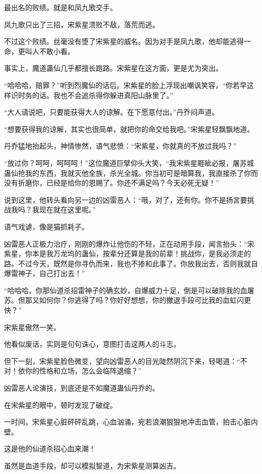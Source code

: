 \begin{this_body}
最出名的败绩。就是和凤九歌交手。

凤九歌只出了三招，宋紫星溃败不敌，落荒而逃。

不过这个败绩。丝毫没有堕了宋紫星的威名。因为对手是凤九歌，他却能逃得一命，更叫人不敢小看。

事实上，魔道蛊仙几乎都擅长跑路。宋紫星在这方面，更是尤为突出。

“哈哈哈，赔罪？”听到烈魔仙的话后。宋紫星的脸上浮现出嘲讽笑容，“你若早这样识时务的话。我也不会追杀得你躲进真阳山脉里了。”

“大人请说吧，只要能获得大人的谅解。在下愿意付出。”丹乔闷声道。

“想要获得我的谅解，其实也很简单，就把你的命交给我吧。”宋紫星轻飘飘地道。

丹乔猛地抬起头，神情惨然，语气悲愤：“宋紫星，你就真的不放过我吗？”

“放过你？呵呵，呵呵呵！”这位魔道巨擘仰头大笑，“我宋紫星睚眦必报，屠苏城蛊仙抢我的东西，我就灭他全族，杀光全城。你当初可是暗算我，我直接杀了你而没有折磨你，已经是给你的恩赐了。你还不满足吗？今天必死无疑！”

说到这里，他转头看向另一边的凶雷恶人：“哦，对了，还有你。你不是扬言要挑战我吗？我现在就在这里呢。”

语气戏谑，像是猫抓耗子。

凶雷恶人正极力治疗，刚刚的爆炸让他伤的不轻，正在动用手段，闻言抬头：“宋紫星，你本是我万龙坞的蛊仙，按辈分还算是我的前辈！挑战你，是我必须走的路。不过今天，既然是你寻仇而来，我也不掺和此事了。你放我出去，否则我就自爆雷神子，自己打出去！”

“哈哈哈，你那仙道杀招雷神子的确玄妙，自爆威力十足，倒是可以破除我的血屠苏。但那又如何你？你逃得了吗？你好好想想，你的撤退手段可比我的血虹闪更快？”

宋紫星傲然一笑。

他看似废话，实则是句句诛心，意图打击这两人的斗志。

但下一刻，宋紫星脸色微变，望向凶雷恶人的目光陡然阴沉下来，轻喝道：“不对！依你的性格和立场，怎么会临阵退缩？”

凶雷恶人论演技，到底还是不如魔道蛊仙丹乔的。

在宋紫星的眼中，顿时发现了破绽。

一时间，宋紫星心脏砰砰乱跳，心血汹涌，宛若浪潮狠狠地冲击血管，拍击心脏内壁。

这是他的仙道杀招心血来潮！

虽然是血道手段，却可以模拟智道，为宋紫星测算凶吉。


\end{this_body}
